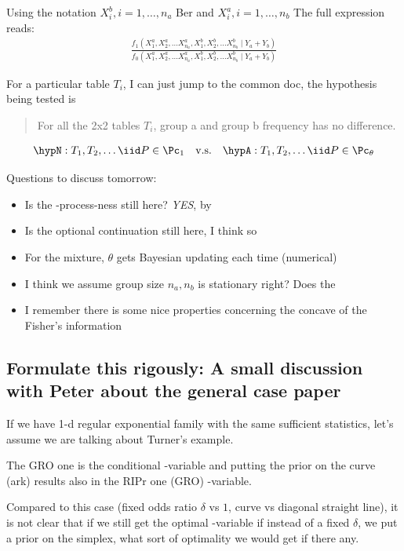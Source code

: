 Using the notation $X^b_i, i = 1,\dots, n_a$ Ber and $X^a_i, i =1,\dots,n_b$
The full expression reads:
\begin{align*}
	\frac{f_1(X_1^a, X_2^a,\dots X_{n_a}^a, X_1^b, X_2^b,\dots X_{n_b}^b \mid Y_a + Y_b)}
	{f_0(X_1^a, X_2^a,\dots X_{n_a}^a, X_1^b, X_2^b,\dots X_{n_b}^b \mid Y_a + Y_b)}
\end{align*}

For a particular table $T_i$, I can just jump to the common doc, the hypothesis being tested is

\begin{quote}
	For all the 2x2 tables $T_i$, group a and group b frequency
	has no difference.
\end{quote}

\begin{align*}
	\hypN: T_1, T_2, \dots \iid P \in \Pc_1
	\quad \textrm{v.s.} \quad
	\hypA: T_1, T_2, \dots \iid P \in \Pc_{\theta}
\end{align*}

Questions to discuss tomorrow:

\begin{itemize}
	\item Is the \E-process-ness still here? \emph{YES}, by
	\item Is the optional continuation still here, I think so
	\item For the mixture, $\theta$ gets Bayesian updating each time (numerical)
	\item I think we assume group size $n_a, n_b$ is stationary right? Does the
	\item I remember there is some nice properties concerning the concave of the Fisher's information
\end{itemize}

\subsection*{Formulate this rigously: A small discussion with Peter about the general case paper}

If we have 1-d regular exponential family with the same sufficient statistics,
let's assume we are talking about Turner's example.

The GRO one is the conditional \E-variable and putting the prior on the curve (ark)
results also in the RIPr one (GRO) \E-variable.

Compared to this case (fixed odds ratio $\delta$ vs $1$, curve vs diagonal straight line),
it is not clear that if we still get the optimal \E-variable if instead of a fixed $\delta$,
we put a prior on the simplex, what sort of optimality we would get if there any.

